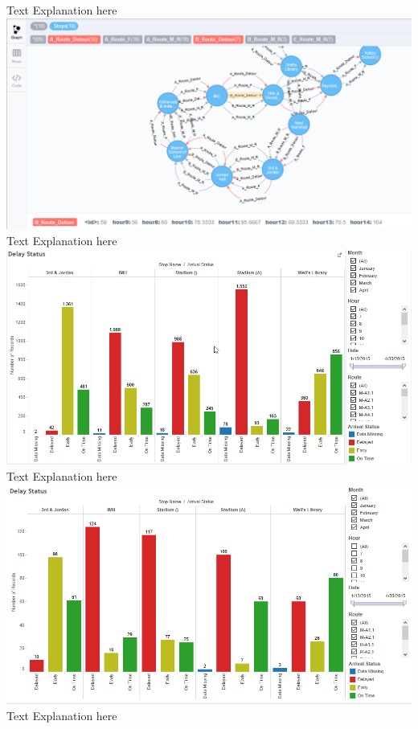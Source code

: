 \documentclass[12pt]{article}
\begin{document}
Text Explanation here\\
\includegraphics[scale=0.55]{resources/neo4j3}\\[1cm] 
Text Explanation here\\
\includegraphics[scale=0.55]{resources/tableau1}\\[1cm] 
Text Explanation here\\
\includegraphics[scale=0.55]{resources/tableau2}\\[1cm] 
Text Explanation here\\
\end{document}
